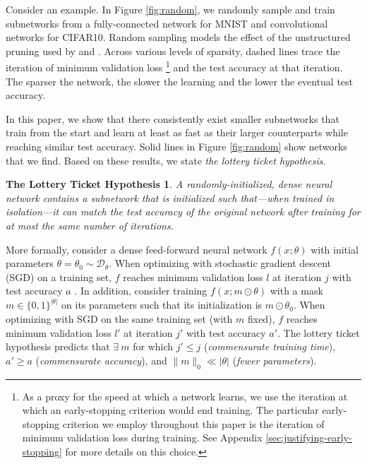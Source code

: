 Consider an example. In Figure \ref{fig:random}, we randomly sample and train subnetworks
from a fully-connected network for MNIST and convolutional networks for CIFAR10. Random sampling models the effect
of the unstructured pruning used by \citet{brain-damage} and \citet{han-pruning}. Across various levels of sparsity,
dashed lines trace the iteration of minimum validation loss%
\footnote{As a proxy for the speed
at which a network learns, we use
the iteration at which an early-stopping criterion would end training. The
particular early-stopping
criterion we employ
throughout this paper
is the iteration of minimum validation loss during training. See Appendix \ref{sec:justifying-early-stopping} for more details on this choice.}
and the test accuracy at that iteration.
The sparser the network, the slower the learning and the lower the eventual test accuracy.

In this paper, we show that there consistently exist smaller subnetworks
that train from the start and learn at least as fast as their larger counterparts while reaching similar test accuracy.
Solid lines in Figure \ref{fig:random} show networks that we find.
Based on these results, we state \emph{the lottery ticket hypothesis}.

\newtheorem*{lth}{The Lottery Ticket Hypothesis}

\begin{lth}
A randomly-initialized, dense neural network contains
a subnetwork that is initialized such that---when trained in isolation---it can match the test accuracy of the original network
after training for at most the same number of iterations.
\end{lth}

More formally, consider a dense feed-forward neural network $f(x; \theta)$ with initial parameters $\theta = \theta_0 \sim \mathcal{D}_\theta$.
When optimizing with stochastic gradient descent (SGD) on a training set, $f$ reaches minimum validation
loss $l$ at iteration $j$ with test accuracy $a$ . In addition, consider training $f(x; m \odot \theta)$ with a mask $m \in \{0, 1\}^{|\theta|}$ on its parameters such that its
initialization is $m \odot \theta_0$. When optimizing with SGD on the same training set (with $m$ fixed),
$f$ reaches minimum validation loss $l'$ at iteration $j'$ with test
accuracy $a'$. The lottery ticket hypothesis predicts that $\exists~m$ for which $j' \leq j$ (\emph{commensurate training time}),
$a' \geq a$
(\emph{commensurate accuracy}), and
$\lVert m \rVert_0 \ll |\theta |$ (\emph{fewer parameters}).

